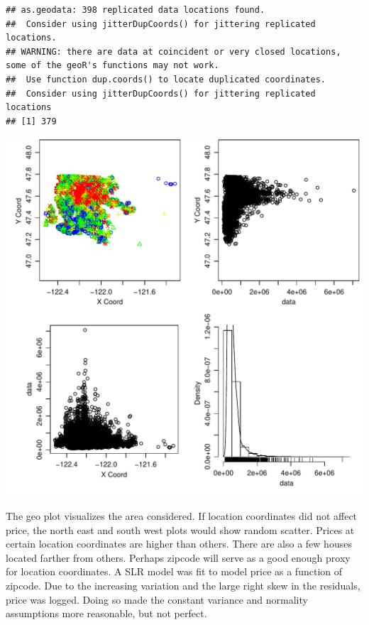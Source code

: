 \documentclass{article}\usepackage[]{graphicx}\usepackage[]{color}
\makeatletter
\def\maxwidth{ %
  \ifdim\Gin@nat@width>\linewidth
    \linewidth
  \else
    \Gin@nat@width
  \fi
}
\newenvironment{kframe}{%
 \def\at@end@of@kframe{}%
 \ifinner\ifhmode%
  \def\at@end@of@kframe{\end{minipage}}%
  \begin{minipage}{\columnwidth}%
 \fi\fi%
 \def\FrameCommand##1{\hskip\@totalleftmargin \hskip-\fboxsep
 \colorbox{shadecolor}{##1}\hskip-\fboxsep
     \hskip-\linewidth \hskip-\@totalleftmargin \hskip\columnwidth}%
 \MakeFramed {\advance\hsize-\width
   \@totalleftmargin\z@ \linewidth\hsize
   \@setminipage}}%
 {\par\unskip\endMakeFramed%
 \at@end@of@kframe}
\newenvironment{knitrout}{}{} %
\makeatother
\begin{document}
\begin{enumerate}
\begin{enumerate}
\begin{knitrout}
\end{knitrout}

\begin{knitrout}
\color{fgcolor}\begin{kframe}
\begin{verbatim}
## as.geodata: 398 replicated data locations found. 
##  Consider using jitterDupCoords() for jittering replicated locations. 
## WARNING: there are data at coincident or very closed locations, some of the geoR's functions may not work.
##  Use function dup.coords() to locate duplicated coordinates.
##  Consider using jitterDupCoords() for jittering replicated locations
## [1] 379
\end{verbatim}
\end{kframe}
\includegraphics[width=\maxwidth]{figure/prob3ax-1} 

\end{knitrout}

The geo plot visualizes the area considered. If location coordinates did not affect price, the north east and south west plots would show random scatter. Prices at certain location coordinates are higher than others. There are also a few houses located farther from others. Perhaps zipcode will serve as a good enough proxy for location coordinates. A SLR model was fit to model price as a function of zipcode. Due to the increasing variation and the large right skew in the residuals, price was logged. Doing so made the constant variance and normality assumptions more reasonable, but not perfect. 


\end{enumerate}
\end{enumerate}
\end{document}
